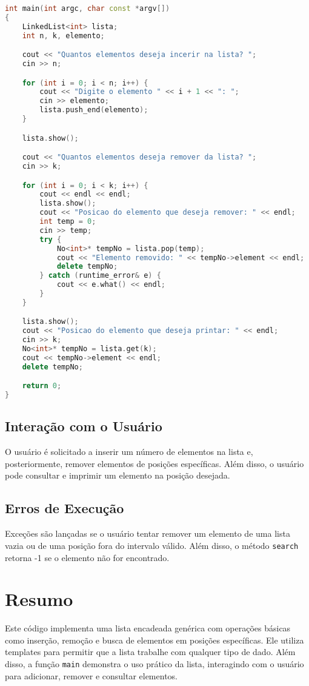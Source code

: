 \documentclass[a4paper,12pt]{article}
\begin{document}
\begin{lstlisting}[language=C++, caption=Função main]
int main(int argc, char const *argv[])
{
    LinkedList<int> lista;
    int n, k, elemento;

    cout << "Quantos elementos deseja incerir na lista? ";
    cin >> n;

    for (int i = 0; i < n; i++) {
        cout << "Digite o elemento " << i + 1 << ": ";
        cin >> elemento;
        lista.push_end(elemento);
    }

    lista.show();

    cout << "Quantos elementos deseja remover da lista? ";
    cin >> k;

    for (int i = 0; i < k; i++) {
        cout << endl << endl;
        lista.show();
        cout << "Posicao do elemento que deseja remover: " << endl;
        int temp = 0;
        cin >> temp;
        try {
            No<int>* tempNo = lista.pop(temp);
            cout << "Elemento removido: " << tempNo->element << endl;
            delete tempNo;
        } catch (runtime_error& e) {
            cout << e.what() << endl;
        }
    }

    lista.show();
    cout << "Posicao do elemento que deseja printar: " << endl;
    cin >> k;
    No<int>* tempNo = lista.get(k);
    cout << tempNo->element << endl;
    delete tempNo;

    return 0;
}
\end{lstlisting}

\subsection{Interação com o Usuário}

O usuário é solicitado a inserir um número de elementos na lista e, posteriormente, remover elementos de posições específicas. Além disso, o usuário pode consultar e imprimir um elemento na posição desejada.

\subsection{Erros de Execução}

Exceções são lançadas se o usuário tentar remover um elemento de uma lista vazia ou de uma posição fora do intervalo válido. Além disso, o método \texttt{search} retorna -1 se o elemento não for encontrado.

\section{Resumo}

Este código implementa uma lista encadeada genérica com operações básicas como inserção, remoção e busca de elementos em posições específicas. Ele utiliza templates para permitir que a lista trabalhe com qualquer tipo de dado. Além disso, a função \texttt{main} demonstra o uso prático da lista, interagindo com o usuário para adicionar, remover e consultar elementos.
\end{document}
